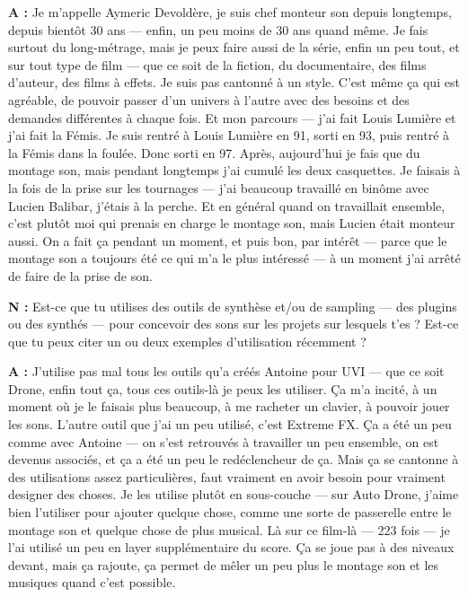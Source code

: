 ﻿\documentclass[12pt]{article}
\begin{document}
\textbf{A :} Je m'appelle Aymeric Devoldère, je suis chef monteur son depuis longtemps, depuis bientôt 30 ans — enfin, un peu moins de 30 ans quand même. Je fais surtout du long-métrage, mais je peux faire aussi de la série, enfin un peu tout, et sur tout type de film — que ce soit de la fiction, du documentaire, des films d'auteur, des films à effets. Je suis pas cantonné à un style. C'est même ça qui est agréable, de pouvoir passer d'un univers à l'autre avec des besoins et des demandes différentes à chaque fois. Et mon parcours — j'ai fait Louis Lumière et j'ai fait la Fémis. Je suis rentré à Louis Lumière en 91, sorti en 93, puis rentré à la Fémis dans la foulée. Donc sorti en 97. Après, aujourd'hui je fais que du montage son, mais pendant longtemps j'ai cumulé les deux casquettes. Je faisais à la fois de la prise sur les tournages — j'ai beaucoup travaillé en binôme avec Lucien Balibar, j'étais à la perche. Et en général quand on travaillait ensemble, c'est plutôt moi qui prenais en charge le montage son, mais Lucien était monteur aussi. On a fait ça pendant un moment, et puis bon, par intérêt — parce que le montage son a toujours été ce qui m'a le plus intéressé — à un moment j'ai arrêté de faire de la prise de son. 

\textbf{N :} Est-ce que tu utilises des outils de synthèse et/ou de sampling — des plugins ou des synthés — pour concevoir des sons sur les projets sur lesquels t'es ? Est-ce que tu peux citer un ou deux exemples d'utilisation récemment ? 

\textbf{A :} J'utilise pas mal tous les outils qu'a créés Antoine pour UVI — que ce soit Drone, enfin tout ça, tous ces outils-là je peux les utiliser. Ça m'a incité, à un moment où je le faisais plus beaucoup, à me racheter un clavier, à pouvoir jouer les sons. L'autre outil que j'ai un peu utilisé, c'est Extreme FX. Ça a été un peu comme avec Antoine — on s'est retrouvés à travailler un peu ensemble, on est devenus associés, et ça a été un peu le redéclencheur de ça. Mais ça se cantonne à des utilisations assez particulières, faut vraiment en avoir besoin pour vraiment designer des choses. Je les utilise plutôt en sous-couche — sur Auto Drone, j'aime bien l'utiliser pour ajouter quelque chose, comme une sorte de passerelle entre le montage son et quelque chose de plus musical. Là sur ce film-là — 223 fois — je l'ai utilisé un peu en layer supplémentaire du score. Ça se joue pas à des niveaux devant, mais ça rajoute, ça permet de mêler un peu plus le montage son et les musiques quand c'est possible. 
\end{document}

